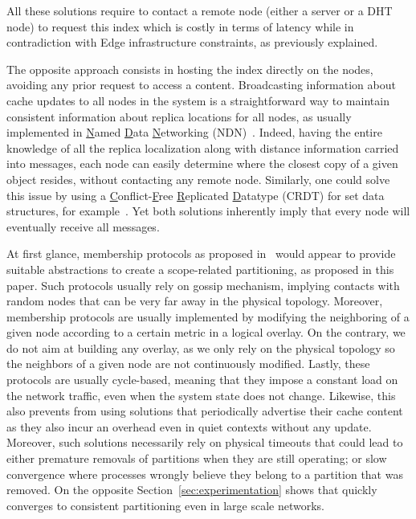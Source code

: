All these solutions require to contact a remote node (either a server
or a DHT node) to request this index which is costly in terms of
latency while in contradiction with Edge infrastructure constraints,
as previously explained.

The opposite approach consists in hosting the index directly on the
nodes, avoiding any prior request to access a content.
Broadcasting information about cache updates to all nodes in the
system is a straightforward way to maintain consistent information
about replica locations for all nodes, as usually implemented in
\underline{N}amed \underline{D}ata \underline{N}etworking
(NDN)~\cite{nlsr}.  Indeed, having the entire knowledge of all the
replica localization along with distance information carried into
messages, each node can easily determine where the closest copy of a
given object resides, without contacting any remote node.  Similarly,
one could solve this issue by using a
\underline{C}onflict-\underline{F}ree \underline{R}eplicated
\underline{D}atatype (CRDT) for set data structures, for
example~\cite{shapiro2011crdts}. Yet both solutions inherently imply
that every node will eventually receive all messages.


At first glance, membership protocols as proposed in~\cite{t-man}
would appear to provide suitable abstractions to create a
scope-related partitioning, as proposed in this paper. Such protocols
usually rely on gossip mechanism, implying contacts with random nodes
that can be very far away in the physical topology. Moreover,
membership protocols are usually implemented by modifying the
neighboring of a given node according to a certain metric in a logical
overlay.  On the contrary, we do not aim at building any overlay, as
we only rely on the physical topology so the neighbors of a given node
are not continuously modified. Lastly, these protocols are usually
cycle-based, meaning that they impose a constant load on the network
traffic, even when the system state does not change. Likewise, this
also prevents from using solutions that periodically advertise their
cache content~\cite{garcia-lopez, hemmati2015namebased} as they also
incur an overhead even in quiet contexts without any update.
Moreover, such solutions necessarily rely on physical timeouts that
could lead to either premature removals of partitions when they are
still operating; or slow convergence where processes wrongly believe
they belong to a partition that was removed. On the opposite
Section~\ref{sec:experimentation} shows that \NAME quickly converges
to consistent partitioning even in large scale networks.

